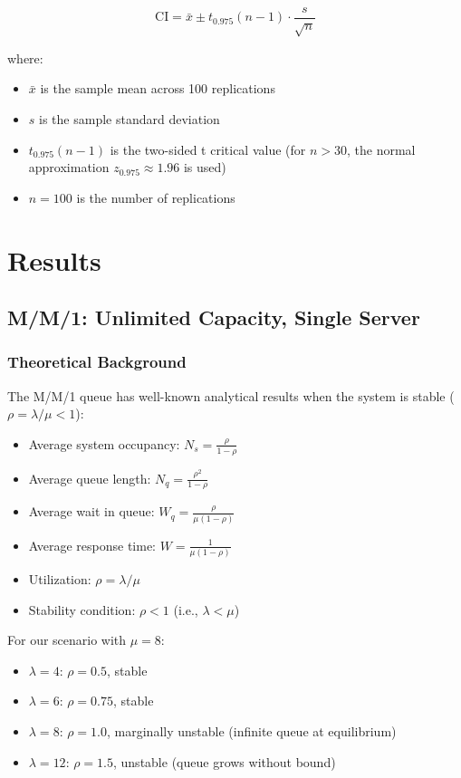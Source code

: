 \documentclass[12pt]{article}
\begin{document}
\begin{equation}
    \text{CI} = \bar{x} \pm t_{0.975}(n-1) \cdot \frac{s}{\sqrt{n}}
\end{equation}

where:
\begin{itemize}
    \item $\bar{x}$ is the sample mean across 100 replications
    \item $s$ is the sample standard deviation
    \item $t_{0.975}(n-1)$ is the two-sided t critical value (for $n > 30$, the normal approximation $z_{0.975} \approx 1.96$ is used)
    \item $n = 100$ is the number of replications
\end{itemize}

\section{Results}

\subsection{M/M/1: Unlimited Capacity, Single Server}

\subsubsection{Theoretical Background}

The M/M/1 queue has well-known analytical results when the system is stable ($\rho = \lambda/\mu < 1$):

\begin{itemize}
    \item Average system occupancy: $N_s = \frac{\rho}{1 - \rho}$
    \item Average queue length: $N_q = \frac{\rho^2}{1 - \rho}$
    \item Average wait in queue: $W_q = \frac{\rho}{\mu(1-\rho)}$
    \item Average response time: $W = \frac{1}{\mu(1-\rho)}$
    \item Utilization: $\rho = \lambda/\mu$
    \item Stability condition: $\rho < 1$ (i.e., $\lambda < \mu$)
\end{itemize}

For our scenario with $\mu = 8$:
\begin{itemize}
    \item $\lambda = 4$: $\rho = 0.5$, stable
    \item $\lambda = 6$: $\rho = 0.75$, stable
    \item $\lambda = 8$: $\rho = 1.0$, marginally unstable (infinite queue at equilibrium)
    \item $\lambda = 12$: $\rho = 1.5$, unstable (queue grows without bound)
\end{itemize}
\end{document}
